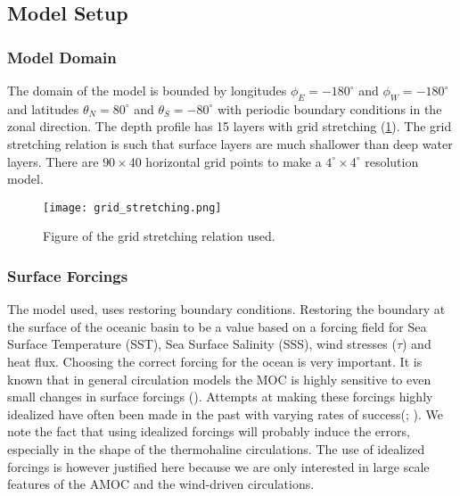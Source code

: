 
\subsection{Model Setup}
\subsubsection{Model Domain}
The domain of the model is bounded by longitudes $\phi_E=-180^{\circ}$ and $\phi_W=-180^{\circ}$ and latitudes $\theta_N=80^{\circ}$ and $\theta_S=-80^{\circ}$ with periodic boundary conditions in the zonal direction.
 The depth profile has 15 layers with grid stretching (\cref{fig:gridstrech}). The grid stretching relation is such that surface layers are much shallower than deep water layers. There are $90 \times 40$ horizontal grid points to make a $4^{\circ} \times 4^{\circ}$ resolution model.
 
 \begin{figure}[H]
 	\texttt{[image: grid\_stretching.png]}
 	\caption{Figure of the grid stretching relation used.}
 	\label{fig:gridstrech}
 \end{figure}

\subsubsection{Surface Forcings}\label{sec:forcing_ideal}
The model used, uses restoring boundary conditions. Restoring the boundary at the surface of the oceanic basin to be a value based on a forcing field for Sea Surface Temperature (SST), Sea Surface Salinity (SSS), wind stresses ($\tau$) and heat flux.
Choosing the correct forcing for the ocean is very important. It is known that in general circulation models the MOC is highly sensitive to even small changes in surface forcings (\cite{Milliff1999May}). Attempts at making these forcings highly idealized have often been made in the past with varying rates of success(\cite{bryan1987parameter}; \cite{Mulder2017Jul}). We note the fact that using idealized forcings will probably induce the errors, especially in the shape of the thermohaline circulations. The use of idealized forcings is however justified here because we are only interested in large scale features of the AMOC and the wind-driven circulations.

